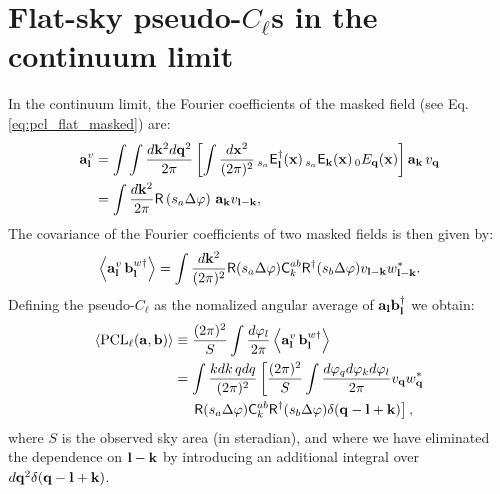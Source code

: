 \documentclass[usenatbib]{mnrasb}
\begin{document}
  \section{Flat-sky pseudo-\texorpdfstring{$C_\ell$}{Cl}s in the continuum limit}\label{app:flat.pcl}
    In the continuum limit, the Fourier coefficients of the masked field (see Eq. \ref{eq:pcl_flat_masked}) are:
    \begin{align}\nonumber
      {\bf a}^v_{\bf l}&=\int\int\frac{d{\bf k}^2d{\bf q}^2}{2\pi}\left[\int\frac{d{\bf x}^2}{(2\pi)^2}\,_{s_a}{\sf E}^\dag_{\bf l}({\bf x})\,_{s_a}{\sf E}_{\bf k}({\bf x})\,_0E_{\bf q}({\bf x})\right]{\bf a}_{\bf k}\,v_{\bf q}\\
                       &=\int\frac{d{\bf k}^2}{2\pi}{\sf R}\left(s_a\Delta\varphi\right)\,{\bf a}_{\bf k}v_{{\bf l}-{\bf k}},
    \end{align}
    The covariance of the Fourier coefficients of two masked fields is then given by:
    \begin{equation}
      \left\langle{\bf a}^v_{\bf l}\,{\bf b}^{w\dag}_{\bf l}\right\rangle=\int\frac{d{\bf k}^2}{(2\pi)^2}{\sf R}(s_a\Delta\varphi){\sf C}^{ab}_k{\sf R}^\dag(s_b\Delta\varphi)v_{{\bf l}-{\bf k}}w^*_{{\bf l}-{\bf k}}.
    \end{equation}
    Defining the pseudo-$C_\ell$ as the nomalized angular average of ${\bf a}_{\bf l}{\bf b}^\dag_{\bf l}$ we obtain:
    \begin{align}
      \left\langle{\rm PCL}_\ell({\bf a},{\bf b})\right\rangle
      &\equiv\frac{(2\pi)^2}{S}\int\frac{d\varphi_l}{2\pi}\left\langle{\bf a}^v_{\bf l}\,{\bf b}^{w\dag}_{\bf l}\right\rangle\\\nonumber
      &=\int\frac{kdk\,qdq}{(2\pi)^2}\left[\frac{(2\pi)^2}{S}\int\frac{d\varphi_qd\varphi_kd\varphi_l}{2\pi}v_{{\bf q}}w^*_{{\bf q}}\right.\\\nonumber
      &\hspace{12pt}\left.{\sf R}(s_a\Delta\varphi){\sf C}^{ab}_k{\sf R}^\dag(s_b\Delta\varphi)\delta({\bf q}-{\bf l}+{\bf k})\right],
    \end{align}
    where $S$ is the observed sky area (in steradian), and where we have eliminated the dependence on ${\bf l}-{\bf k}$ by introducing an additional integral over $d{\bf q}^2\delta({\bf q}-{\bf l}+{\bf k})$.
    
\end{document}
